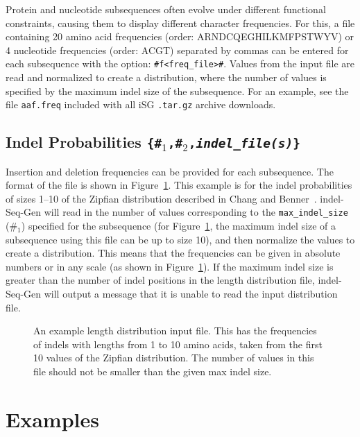 \documentclass[10pt]{article}
\begin{document}
Protein and nucleotide subsequences often evolve under different functional constraints, causing 
them to display different character frequencies. For this, a file containing 20 amino acid
frequencies (order: ARNDCQEGHILKMFPSTWYV) or 4 nucleotide frequencies (order: ACGT) separated by 
commas can be entered for each subsequence with the option: 
\verb+#f<freq_file>#+.  Values from the input file are read and normalized to create a 
distribution, where the number of values is specified by the maximum indel size of the 
subsequence. For an example, see the file {\tt aaf.freq} included with all iSG {\tt .tar.gz} 
archive downloads.

\subsection{Indel Probabilities {\tt \{\#$_1$,\#$_2$,{\it indel\_file(s)}\}}}

Insertion and deletion frequencies can be provided for each subsequence.  The format of the
file is shown in Figure~\ref{fig:zipf}.  This example is for the indel probabilities of sizes
1--10 of the Zipfian distribution described in Chang and Benner~\cite{Chang04}.  
indel-Seq-Gen will read in the number of values corresponding to the {\tt max\_indel\_size}
(\#$_1$) specified for the subsequence (for Figure~\ref{fig:zipf}, the maximum indel size of a
subsequence using this file can be up to size 10), and then normalize the values to create a
distribution.  This means that the frequencies can be given in absolute numbers or in any
scale (as shown in Figure~\ref{fig:zipf}).  If the maximum indel size is greater than the
number of indel positions in the length distribution file, indel-Seq-Gen will output a message
that it is unable to read the input distribution file.

\begin{figure}[htbp]
\centering
{}
\caption{An example length distribution input file.  This has the frequencies of indels with 
lengths from 1 to 10 amino acids, taken from the first 10 values of the Zipfian 
distribution.  The number of values in this file should not be smaller than the given max 
indel size.}
\label{fig:zipf}
\end{figure}

\section{Examples}
\label{sec:example}
\end{document}
